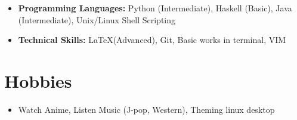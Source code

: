 \documentclass[10pt,a4paper,sans,colorlinks]{moderncv}        %
\begin{document}
	\begin{itemize}
		
		\item \textbf{Programming Languages:} Python (Intermediate), Haskell (Basic), Java (Intermediate), Unix/Linux Shell Scripting
		
		\item \textbf{Technical Skills:} \LaTeX (Advanced), Git, Basic works in terminal, VIM
		
		
	\end{itemize}
	\section{Hobbies}

	\begin{itemize}
		
		\item  Watch Anime, Listen Music (J-pop, Western), Theming linux desktop
		
		
	\end{itemize}
%	
	
	
	
\end{document}
